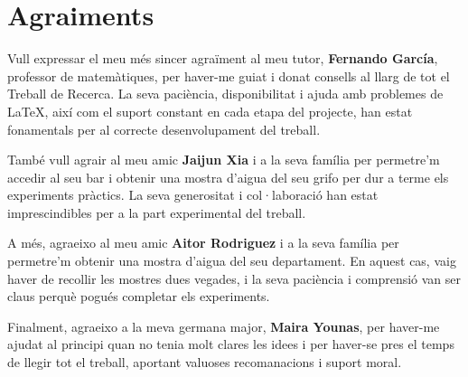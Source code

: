 \chapter*{Agraiments}
Vull expressar el meu més sincer agraïment al meu tutor, \textbf{Fernando García}, professor de matemàtiques, per haver-me guiat i donat consells al llarg de tot el Treball de Recerca. La seva paciència, disponibilitat i ajuda amb problemes de LaTeX, així com el suport constant en cada etapa del projecte, han estat fonamentals per al correcte desenvolupament del treball.

També vull agrair al meu amic \textbf{Jaijun Xia} i a la seva família per permetre'm accedir al seu bar i obtenir una mostra d’aigua del seu grifo per dur a terme els experiments pràctics. La seva generositat i col·laboració han estat imprescindibles per a la part experimental del treball.

A més, agraeixo al meu amic \textbf{Aitor Rodriguez} i a la seva família per permetre'm obtenir una mostra d’aigua del seu departament. En aquest cas, vaig haver de recollir les mostres dues vegades, i la seva paciència i comprensió van ser claus perquè pogués completar els experiments.

Finalment, agraeixo a la meva germana major, \textbf{Maira Younas}, per haver-me ajudat al principi quan no tenia molt clares les idees i per haver-se pres el temps de llegir tot el treball, aportant valuoses recomanacions i suport moral.
